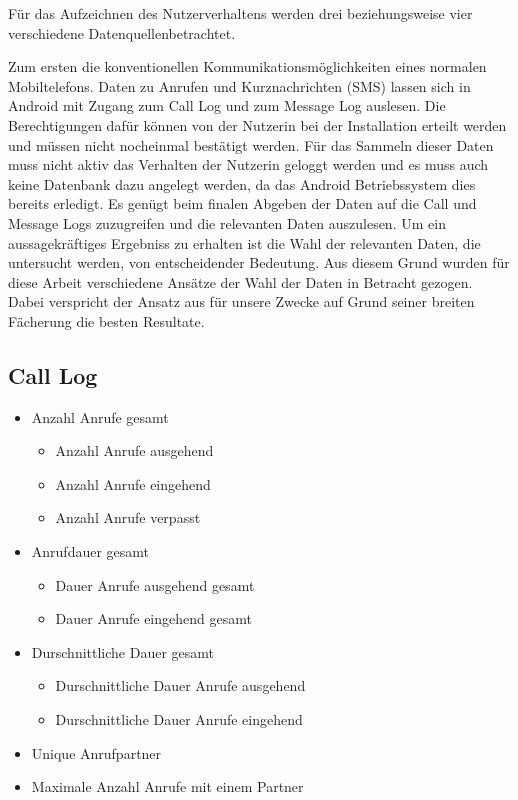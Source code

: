 Für das Aufzeichnen des Nutzerverhaltens werden drei beziehungsweise vier verschiedene Datenquellenbetrachtet.
\par
Zum ersten die konventionellen Kommunikationsmöglichkeiten eines normalen Mobiltelefons.
Daten zu Anrufen und Kurznachrichten (SMS) lassen sich in Android mit Zugang zum Call Log und zum Message Log auslesen.
Die Berechtigungen dafür können von der Nutzerin bei der Installation erteilt werden und müssen nicht nocheinmal bestätigt werden.
Für das Sammeln dieser Daten muss nicht aktiv das Verhalten der Nutzerin geloggt werden und es muss auch keine Datenbank dazu angelegt werden,
da das Android Betriebssystem dies bereits erledigt.
Es genügt beim finalen Abgeben der Daten auf die Call und Message Logs zuzugreifen und die relevanten Daten auszulesen.
Um ein aussagekräftiges Ergebniss zu erhalten ist die Wahl der relevanten Daten, die untersucht werden, von entscheidender Bedeutung. 
Aus diesem Grund wurden für diese Arbeit verschiedene Ansätze der Wahl der Daten in Betracht gezogen. 
Dabei verspricht der Ansatz aus \cite{chittaranjan2011s} für unsere Zwecke auf Grund seiner breiten Fächerung die besten Resultate.
\par

\subsection{Call Log}

\begin{itemize}
    \item Anzahl Anrufe gesamt
    \begin{itemize}
        \item Anzahl Anrufe ausgehend
        \item Anzahl Anrufe eingehend
        \item Anzahl Anrufe verpasst
    \end{itemize}

    \item Anrufdauer gesamt
    \begin{itemize}
        \item Dauer Anrufe ausgehend gesamt
        \item Dauer Anrufe eingehend gesamt
    \end{itemize}

    \item Durschnittliche Dauer gesamt
    \begin{itemize}
        \item Durschnittliche Dauer Anrufe ausgehend
        \item Durschnittliche Dauer Anrufe eingehend
    \end{itemize}

    \item Unique Anrufpartner
    \item Maximale Anzahl Anrufe mit einem Partner

\end{itemize}

